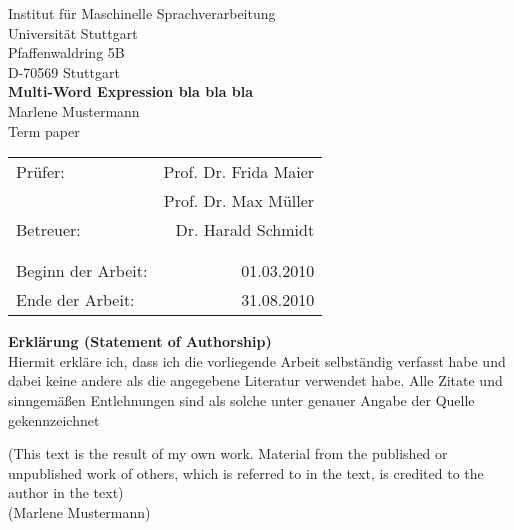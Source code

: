 \documentclass[12pt,leqno,a4paper]{article}
\newcommand{\Titel}{Multi-Word Expression bla bla bla}
\begin{document}
\begin{titlepage}
  \large
  \begin{center}
    Institut f\"ur Maschinelle Sprachverarbeitung\\
    Universit\"at Stuttgart\\
    Pfaffenwaldring 5B\\
    D-70569 Stuttgart\\    
      \vfill
    {\LARGE \bf \Titel} \\
    \vspace{2cm}
    Marlene Mustermann\\
    Term paper 
      \vfill
    \begin{tabular}[t]{lr}
    {Pr\"ufer:} & Prof. Dr. Frida Maier\\
     & Prof. Dr. Max M\"uller\\
    {Betreuer:} & Dr. Harald Schmidt\\ 
    \\
    \\
    {Beginn der Arbeit:} & 01.03.2010\\
    {Ende der Arbeit:} & 31.08.2010\\
    \end{tabular}
  \end{center}

  \normalsize
\end{titlepage}

\newpage
\thispagestyle{empty}


\noindent\textbf{Erkl\"arung (Statement of Authorship)}\\


\noindent Hiermit erkl\"are ich, dass ich die vorliegende Arbeit selbst\"andig verfasst habe und dabei keine andere als die angegebene Literatur verwendet habe. Alle Zitate und sinngem\"a\ss{}en Entlehnungen sind als solche unter genauer Angabe der Quelle gekennzeichnet

\noindent (This text is the result of my own work. Material from the published or unpublished work of others, which is referred to in the text, is credited to the author in the text)\\[2cm]


\noindent (Marlene Mustermann)


\newpage

\tableofcontents
\newpage





















\end{document}

